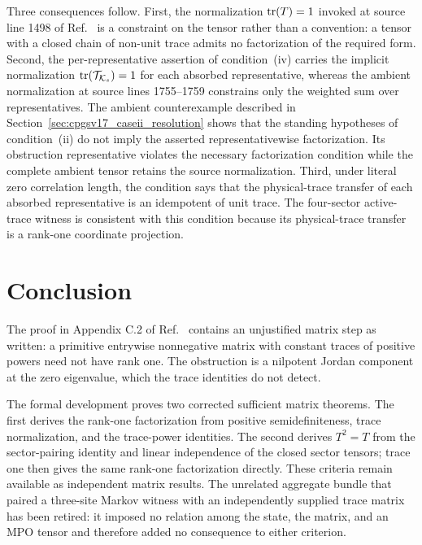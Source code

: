 \documentclass{article}
\begin{document}
Three consequences follow. First, the normalization $\operatorname{tr}(T)=1$ invoked at
source line 1498 of Ref.~\cite{Cirac2016MPDO_arXiv} is a constraint on the
tensor rather than a convention: a tensor with a closed chain of non-unit
trace admits no factorization of the required form. Second, the
per-representative assertion of condition~(iv) carries the implicit
normalization $\operatorname{tr}(\mathcal T_{\mathcal K_s})=1$ for each absorbed
representative, whereas the ambient normalization at source lines 1755--1759
constrains only the weighted sum over representatives. The ambient
counterexample described in Section~\ref{sec:cpgsv17_caseii_resolution}
shows that the standing
hypotheses of condition~(ii) do not imply the asserted representativewise
factorization. Its obstruction representative violates the necessary
factorization condition while the complete ambient tensor retains the source
normalization. Third, under literal zero correlation length, the condition says
that the physical-trace transfer of each absorbed representative is an
idempotent of unit trace. The four-sector active-trace witness is consistent
with this condition because its physical-trace transfer is a rank-one
coordinate projection.

\section{Conclusion}
\label{sec:cpgsv17_conclusion}

The proof in Appendix C.2 of Ref.~\cite{Cirac2016MPDO_arXiv} contains an
unjustified matrix step as written: a primitive entrywise nonnegative matrix
with constant traces of positive powers need not have rank one. The obstruction
is a nilpotent Jordan component at the zero eigenvalue, which the trace
identities do not detect.

The formal development proves two corrected sufficient matrix theorems. The
first derives the rank-one factorization from positive semidefiniteness, trace
normalization, and the trace-power identities. The second derives $T^2=T$ from
the sector-pairing identity and linear independence of the closed sector
tensors; trace one then gives the same rank-one factorization directly. These
criteria remain available as independent matrix results. The unrelated
aggregate bundle that paired a three-site Markov witness with an independently
supplied trace matrix has been retired: it imposed no relation among the
state, the matrix, and an MPO tensor and therefore added no consequence to
either criterion.
\end{document}
